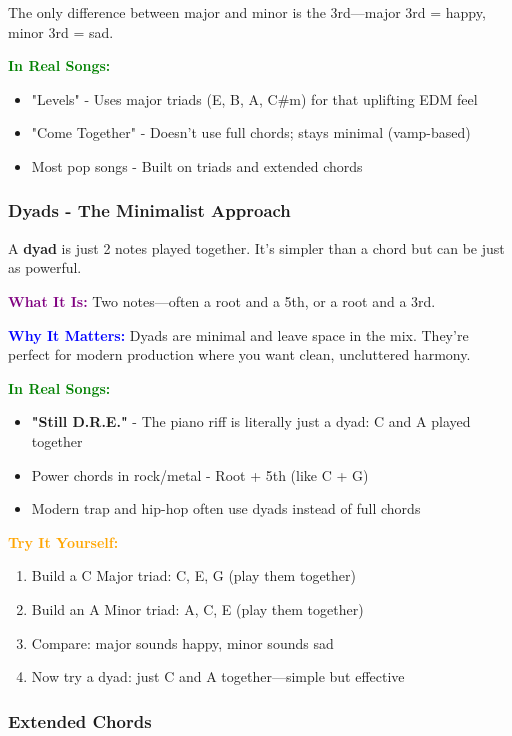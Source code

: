 \documentclass[11pt,letterpaper]{article}
\newcommand{\purple}[1]{\textcolor{purple}{\textbf{#1}}}
\newcommand{\bluepurple}[1]{\textcolor{blue}{\textbf{#1}}}
\newcommand{\greentext}[1]{\textcolor{green}{\textbf{#1}}}
\newcommand{\orangetext}[1]{\textcolor{orange}{\textbf{#1}}}
\begin{document}
The only difference between major and minor is the 3rd—major 3rd = happy, minor 3rd = sad.

\textbf{\greentext{In Real Songs:}}
\begin{itemize}[leftmargin=*]
\item "Levels" - Uses major triads (E, B, A, C\#m) for that uplifting EDM feel
\item "Come Together" - Doesn't use full chords; stays minimal (vamp-based)
\item Most pop songs - Built on triads and extended chords
\end{itemize}

\subsubsection{Dyads - The Minimalist Approach}

A \textbf{dyad} is just 2 notes played together. It's simpler than a chord but can be just as powerful.

\textbf{\purple{What It Is:}} Two notes—often a root and a 5th, or a root and a 3rd.

\textbf{\bluepurple{Why It Matters:}} Dyads are minimal and leave space in the mix. They're perfect for modern production where you want clean, uncluttered harmony.

\textbf{\greentext{In Real Songs:}}
\begin{itemize}[leftmargin=*]
\item \textbf{"Still D.R.E."} - The piano riff is literally just a dyad: C and A played together
\item Power chords in rock/metal - Root + 5th (like C + G)
\item Modern trap and hip-hop often use dyads instead of full chords
\end{itemize}

\textbf{\orangetext{Try It Yourself:}}

\begin{enumerate}[leftmargin=*]
\item Build a C Major triad: C, E, G (play them together)
\item Build an A Minor triad: A, C, E (play them together)
\item Compare: major sounds happy, minor sounds sad
\item Now try a dyad: just C and A together—simple but effective
\end{enumerate}

\subsubsection{Extended Chords}
\end{document}
